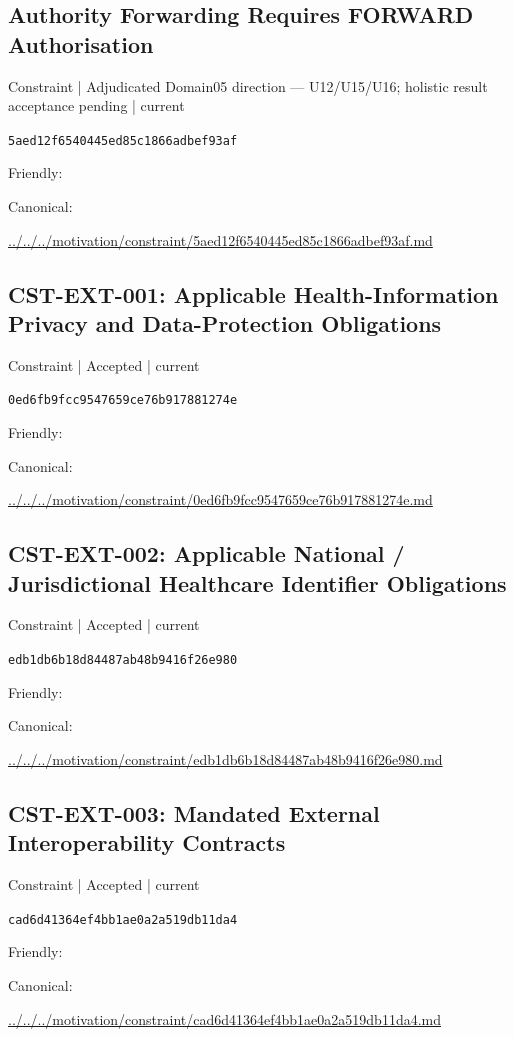 \documentclass[10pt,a4paper]{article}
\begin{document}
\subsection*{Authority Forwarding Requires FORWARD Authorisation}
{\small Constraint | Adjudicated Domain05 direction — U12/U15/U16; holistic result acceptance pending | current}\par
\texttt{5aed12f6540445ed85c1866adbef93af}\par
Friendly: \par
Canonical: \par
{\footnotesize\url{../../../motivation/constraint/5aed12f6540445ed85c1866adbef93af.md}}\par
\subsection*{CST-EXT-001: Applicable Health-Information Privacy and Data-Protection Obligations}
{\small Constraint | Accepted | current}\par
\texttt{0ed6fb9fcc9547659ce76b917881274e}\par
Friendly: \par
Canonical: \par
{\footnotesize\url{../../../motivation/constraint/0ed6fb9fcc9547659ce76b917881274e.md}}\par
\subsection*{CST-EXT-002: Applicable National / Jurisdictional Healthcare Identifier Obligations}
{\small Constraint | Accepted | current}\par
\texttt{edb1db6b18d84487ab48b9416f26e980}\par
Friendly: \par
Canonical: \par
{\footnotesize\url{../../../motivation/constraint/edb1db6b18d84487ab48b9416f26e980.md}}\par
\subsection*{CST-EXT-003: Mandated External Interoperability Contracts}
{\small Constraint | Accepted | current}\par
\texttt{cad6d41364ef4bb1ae0a2a519db11da4}\par
Friendly: \par
Canonical: \par
{\footnotesize\url{../../../motivation/constraint/cad6d41364ef4bb1ae0a2a519db11da4.md}}\par
\end{document}
